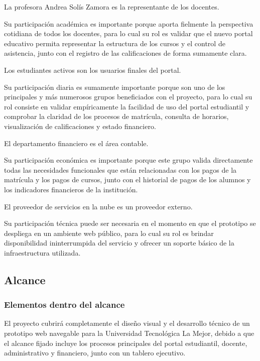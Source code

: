 \documentclass[11pt,spanish]{article}
\begin{document}
La profesora Andrea Solís Zamora es la representante de los docentes.

Su participación académica es importante porque aporta fielmente la perspectiva cotidiana de todos los docentes, para lo cual su rol es validar que el nuevo portal educativo permita representar la estructura de los cursos y el control de asistencia, junto con el registro de las calificaciones de forma sumamente clara.

Los estudiantes activos son los usuarios finales del portal.

Su participación diaria es sumamente importante porque son uno de los principales y más numerosos grupos beneficiados con el proyecto, para lo cual su rol consiste en validar empíricamente la facilidad de uso del portal estudiantil y comprobar la claridad de los procesos de matrícula, consulta de horarios, visualización de calificaciones y estado financiero.

El departamento financiero es el área contable.

Su participación económica es importante porque este grupo valida directamente todas las necesidades funcionales que están relacionadas con los pagos de la matrícula y los pagos de cursos, junto con el historial de pagos de los alumnos y los indicadores financieros de la institución.

El proveedor de servicios en la nube es un proveedor externo.

Su participación técnica puede ser necesaria en el momento en que el prototipo se despliega en un ambiente web público, para lo cual su rol es brindar disponibilidad ininterrumpida del servicio y ofrecer un soporte básico de la infraestructura utilizada.

\subsection{Alcance}

\subsubsection{Elementos dentro del alcance}

El proyecto cubrirá completamente el diseño visual y el desarrollo técnico de un prototipo web navegable para la Universidad Tecnológica La Mejor, debido a que el alcance fijado incluye los procesos principales del portal estudiantil, docente, administrativo y financiero, junto con un tablero ejecutivo.
\end{document}
